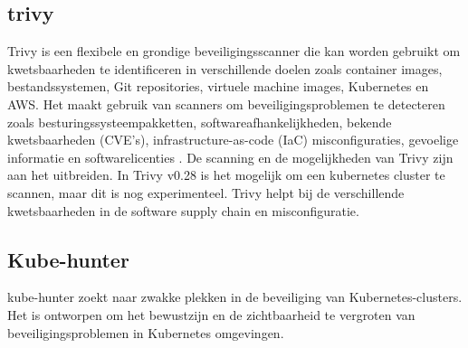 \subsection{trivy}
Trivy is een flexibele en grondige beveiligingsscanner die kan worden gebruikt om kwetsbaarheden te identificeren in verschillende doelen zoals container images, bestandssystemen, Git repositories, virtuele machine images, Kubernetes en AWS. Het maakt gebruik van scanners om beveiligingsproblemen te detecteren zoals besturingssysteempakketten, softwareafhankelijkheden, bekende kwetsbaarheden (CVE's), infrastructure-as-code (IaC) misconfiguraties, gevoelige informatie en softwarelicenties \autocite{Trivy-2023}. De scanning en de mogelijkheden van Trivy zijn aan het uitbreiden. In Trivy v0.28 is het mogelijk om een kubernetes cluster te scannen, maar dit is nog experimenteel. Trivy helpt bij de verschillende kwetsbaarheden in de software supply chain en misconfiguratie. 

 
\subsection{Kube-hunter}
kube-hunter zoekt naar zwakke plekken in de beveiliging van Kubernetes-clusters. Het is ontworpen om het bewustzijn en de zichtbaarheid te vergroten van beveiligingsproblemen in Kubernetes omgevingen. \autocite{kube-hunter-2022}




